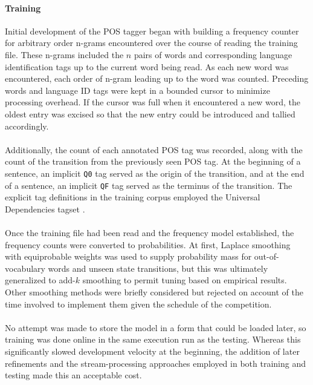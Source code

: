 \documentclass[11pt,a4paper]{article}
\begin{document}
\paragraph{Training}
Initial development of the POS tagger began with building a frequency counter for
arbitrary order n-grams encountered over the course of reading the training file.
These n-grams included the $n$ pairs of words and corresponding language identification
tags up to the current word being read. As each new word was encountered, each
order of n-gram leading up to the word was counted. Preceding words and language ID
tags were kept in a bounded cursor to minimize processing overhead. If the cursor
was full when it encountered a new word, the oldest entry was excised so that the
new entry could be introduced and tallied accordingly.

\paragraph{}
Additionally, the count of each annotated POS tag was recorded, along with the count
of the transition from the previously seen POS tag. At the beginning of a sentence,
an implicit \texttt{Q0} tag served as the origin of the transition, and at the end
of a sentence, an implicit \texttt{QF} tag served as the terminus of the transition.
The explicit tag definitions in the training corpus employed the Universal Dependencies
tagset \cite{UPOS}.

\paragraph{}
Once the training file had been read and the frequency model established,
the frequency counts were converted to probabilities. At first, Laplace smoothing
\cite[47]{JurafskyMartin}
with equiprobable weights was used to supply probability mass for out-of-vocabulary
words and unseen state transitions, but this was ultimately generalized to add-$k$
smoothing \cite[49]{JurafskyMartin} to permit tuning based on empirical results.
Other smoothing methods were briefly considered but rejected on account of the time
involved to implement them given the schedule of the competition.

\paragraph{}
No attempt was made to store the model in a form that could be loaded later,
so training was done online in the same execution run as the testing.
Whereas this significantly slowed development velocity at the beginning,
the addition of later refinements and the stream-processing approaches
employed in both training and testing made this an acceptable cost.
\end{document}
